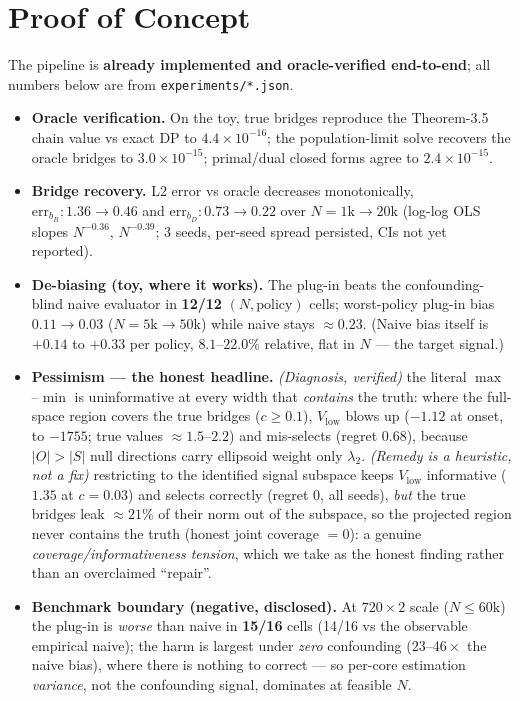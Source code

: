 \documentclass[10pt]{article}
\begin{document}
\section{Proof of Concept}

The pipeline is \textbf{already implemented and oracle-verified end-to-end}; all numbers below are from
\texttt{experiments/*.json}.

\begin{itemize}
  \item \textbf{Oracle verification.} On the toy, true bridges reproduce the Theorem-3.5 chain value vs exact
  DP to $4.4{\times}10^{-16}$; the population-limit solve recovers the oracle bridges to $3.0{\times}10^{-15}$;
  primal/dual closed forms agree to $2.4{\times}10^{-15}$.
  \item \textbf{Bridge recovery.} L2 error vs oracle decreases monotonically, $\mathrm{err}_{b_R}: 1.36\!\to\!
  0.46$ and $\mathrm{err}_{b_D}: 0.73\!\to\!0.22$ over $N{=}1\mathrm{k}\!\to\!20\mathrm{k}$ (log-log OLS slopes
  $N^{-0.36}$, $N^{-0.39}$; 3 seeds, per-seed spread persisted, CIs not yet reported).
  \item \textbf{De-biasing (toy, where it works).} The plug-in beats the confounding-blind naive evaluator in
  \textbf{12/12} $(N,\text{policy})$ cells; worst-policy plug-in bias $0.11\!\to\!0.03$
  ($N{=}5\mathrm{k}\!\to\!50\mathrm{k}$) while naive stays $\approx 0.23$. (Naive bias itself is
  $+0.14$ to $+0.33$ per policy, $8.1$--$22.0\%$ relative, flat in $N$ --- the target signal.)
  \item \textbf{Pessimism --- the honest headline.} \emph{(Diagnosis, verified)} the literal $\max$--$\min$ is
  uninformative at every width that \emph{contains} the truth: where the full-space region covers the true
  bridges ($c\ge 0.1$), $V_{\mathrm{low}}$ blows up ($-1.12$ at onset, to $-1755$; true values
  $\approx 1.5$--$2.2$) and mis-selects (regret $0.68$), because $|O|{>}|S|$ null directions carry ellipsoid
  weight only $\lambda_2$. \emph{(Remedy is a heuristic, not a fix)} restricting to the identified signal
  subspace keeps $V_{\mathrm{low}}$ informative ($1.35$ at $c{=}0.03$) and selects correctly (regret $0$, all
  seeds), \emph{but} the true bridges leak $\approx 21\%$ of their norm out of the subspace, so the projected
  region never contains the truth (honest joint coverage $=0$): a genuine \emph{coverage/informativeness
  tension}, which we take as the honest finding rather than an overclaimed ``repair''.
  \item \textbf{Benchmark boundary (negative, disclosed).} At $720{\times}2$ scale ($N\le 60\mathrm{k}$) the
  plug-in is \emph{worse} than naive in \textbf{15/16} cells (14/16 vs the observable empirical naive); the harm
  is largest under \emph{zero} confounding ($23$--$46\times$ the naive bias), where there is nothing to correct
  --- so per-core estimation \emph{variance}, not the confounding signal, dominates at feasible $N$.
\end{itemize}
\end{document}
